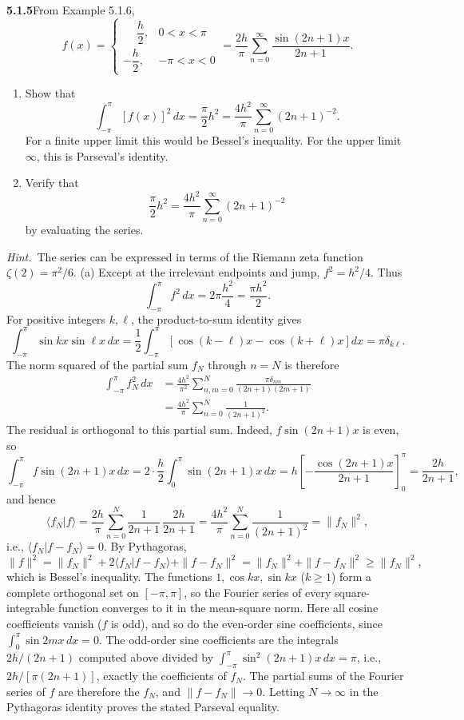 \par\bigskip
\noindent\textbf{5.1.5}\quad From Example 5.1.6,
\[
f(x)=\begin{cases}
\phantom{-}\dfrac{h}{2},&0<x<\pi\\[2ex]
-\dfrac{h}{2},&-\pi<x<0
\end{cases}
=\frac{2h}{\pi}\sum_{n=0}^{\infty}\frac{\sin(2n+1)x}{2n+1}.
\]
\begin{enumerate}
\item[(a)] Show that
  \[
  \int_{-\pi}^{\pi}[f(x)]^{2}\,dx=\frac{\pi}{2}h^{2}
  =\frac{4h^{2}}{\pi}\sum_{n=0}^{\infty}(2n+1)^{-2}.
  \]
  For a finite upper limit this would be Bessel's inequality. For the upper
  limit $\infty$, this is Parseval's identity.
\item[(b)] Verify that
  \[
  \frac{\pi}{2}h^{2}=\frac{4h^{2}}{\pi}\sum_{n=0}^{\infty}(2n+1)^{-2}
  \]
  by evaluating the series.
\end{enumerate}
\emph{Hint.}~The series can be expressed in terms of the Riemann zeta function
$\zeta(2)=\pi^{2}/6$.
\solution
(a) Except at the irrelevant endpoints and jump, $f^2=h^2/4$. Thus
\[
\int_{-\pi}^{\pi} f^2\,dx=2\pi\frac{h^2}{4}=\frac{\pi h^2}{2}.
\]
For positive integers $k,\ell$, the product-to-sum identity gives
\[
\int_{-\pi}^{\pi}\sin kx\sin\ell x\,dx
=\frac12\int_{-\pi}^{\pi}
[\cos(k-\ell)x-\cos(k+\ell)x]dx=\pi\delta_{k\ell}.
\]
The norm squared of the partial sum $f_N$ through $n=N$ is therefore
\begin{align*}
\int_{-\pi}^{\pi}f_N^2\,dx
&=\frac{4h^2}{\pi^2}
 \sum_{n,m=0}^N\frac{\pi\delta_{nm}}{(2n+1)(2m+1)}\\
&=\frac{4h^2}{\pi}\sum_{n=0}^N\frac1{(2n+1)^2}.
\end{align*}
The residual is orthogonal to this partial sum. Indeed, $f\sin(2n+1)x$ is
even, so
\[
\int_{-\pi}^{\pi}f\sin(2n+1)x\,dx
=2\cdot\frac h2\int_0^\pi\sin(2n+1)x\,dx
=h\left[-\frac{\cos(2n+1)x}{2n+1}\right]_0^\pi=\frac{2h}{2n+1},
\]
and hence
\[
\langle f_N|f\rangle=\frac{2h}{\pi}\sum_{n=0}^N\frac1{2n+1}\,\frac{2h}{2n+1}
=\frac{4h^2}{\pi}\sum_{n=0}^N\frac1{(2n+1)^2}=\|f_N\|^2,
\]
i.e., $\langle f_N|f-f_N\rangle=0$. By Pythagoras,
\[
\|f\|^2=\|f_N\|^2+2\langle f_N|f-f_N\rangle+\|f-f_N\|^2
=\|f_N\|^2+\|f-f_N\|^2\ge\|f_N\|^2,
\]
which is Bessel's inequality.
The functions $1,\cos kx,\sin kx$ ($k\ge1$) form a complete orthogonal set
on $[-\pi,\pi]$, so the Fourier series of every square-integrable function
converges to it in the mean-square norm. Here all cosine coefficients
vanish ($f$ is odd), and so do the even-order sine coefficients, since
$\int_0^\pi\sin2mx\,dx=0$. The odd-order sine coefficients are the
integrals $2h/(2n+1)$ computed above divided by
$\int_{-\pi}^{\pi}\sin^2(2n+1)x\,dx=\pi$, i.e., $2h/[\pi(2n+1)]$, exactly
the coefficients of $f_N$. The partial sums of the Fourier series of $f$
are therefore the $f_N$, and $\|f-f_N\|\to0$. Letting $N\to\infty$ in the
Pythagoras identity proves the stated Parseval equality.

